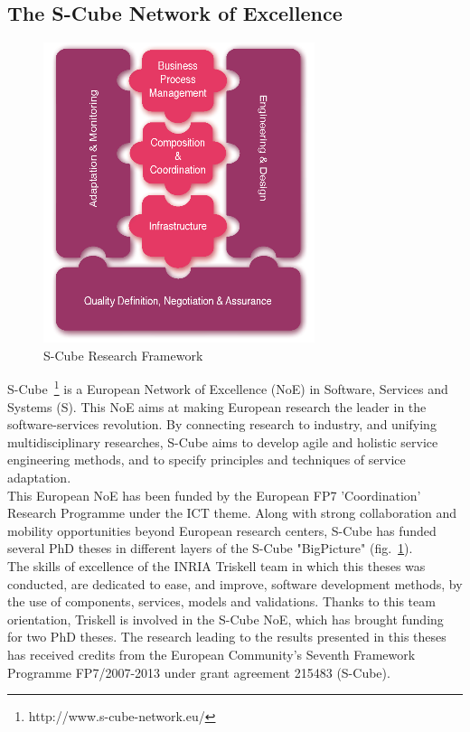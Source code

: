 \subsection{The S-Cube Network of Excellence}

\begin{figure}
  \centering
  \includegraphics[width=.5\textwidth]{part1/pics/scube-overview.png}
  \caption{S-Cube Research Framework}
  \label{fig:scube-overview2}
\end{figure}
S-Cube~\footnote{http://www.s-cube-network.eu/} is a European Network of Excellence (NoE) in Software, Services and Systems (S). This NoE aims at making European research the leader in the software-services revolution. By connecting research to industry, and unifying multidisciplinary researches, S-Cube aims to develop agile and holistic service engineering methods, and to specify principles and techniques of service adaptation.\\
This European NoE has been funded by the European FP7 'Coordination' Research Programme  under the ICT theme. Along with strong collaboration and mobility opportunities beyond European research centers, S-Cube has funded several PhD theses in different layers of the S-Cube "BigPicture" (fig.~\ref{fig:scube-overview2}).\\

The skills of excellence of the INRIA Triskell team in which this theses was conducted, are dedicated to ease, and improve, software development methods, by the use of components, services, models and validations. Thanks to this team orientation, Triskell is involved in the S-Cube NoE, which has brought funding for two PhD theses. The research leading to the results presented in this theses has received credits from the European Community’s Seventh Framework Programme FP7/2007-2013 under grant agreement 215483 (S-Cube).\\

